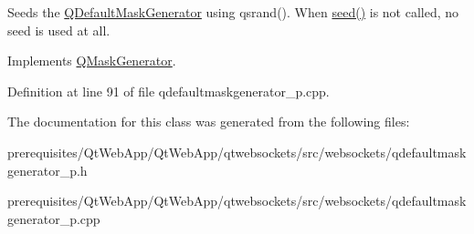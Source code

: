 Seeds the \mbox{\hyperlink{class_q_default_mask_generator}{Q\+Default\+Mask\+Generator}} using qsrand(). When \mbox{\hyperlink{class_q_default_mask_generator_a0ee0187ffa93deb9e30d96f4c560a48d}{seed()}} is not called, no seed is used at all. 

Implements \mbox{\hyperlink{class_q_mask_generator_a4e311595fc7cd457bd5c50293cdb7916}{Q\+Mask\+Generator}}.



Definition at line 91 of file qdefaultmaskgenerator\+\_\+p.\+cpp.



The documentation for this class was generated from the following files\+:\begin{DoxyCompactItemize}
\item 
prerequisites/\+Qt\+Web\+App/\+Qt\+Web\+App/qtwebsockets/src/websockets/qdefaultmaskgenerator\+\_\+p.\+h\item 
prerequisites/\+Qt\+Web\+App/\+Qt\+Web\+App/qtwebsockets/src/websockets/qdefaultmaskgenerator\+\_\+p.\+cpp\end{DoxyCompactItemize}
